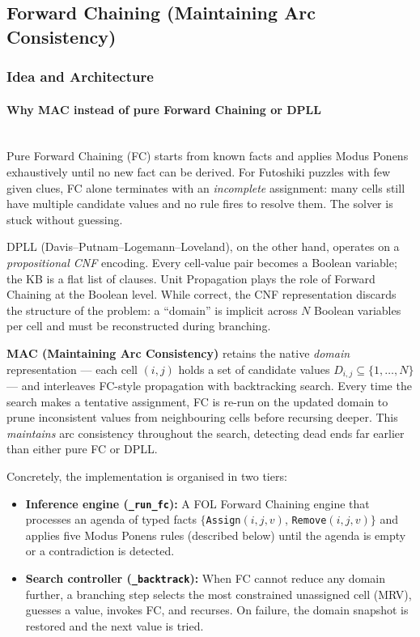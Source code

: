 \subsection{Forward Chaining (Maintaining Arc Consistency)}

\subsubsection{Idea and Architecture}

\paragraph{Why MAC instead of pure Forward Chaining or DPLL}~\\
Pure Forward Chaining (FC) starts from known facts and applies Modus Ponens
exhaustively until no new fact can be derived.  For Futoshiki puzzles with
few given clues, FC alone terminates with an \emph{incomplete} assignment:
many cells still have multiple candidate values and no rule fires to resolve
them.  The solver is stuck without guessing.

DPLL (Davis–Putnam–Logemann–Loveland), on the other hand, operates on a
\emph{propositional CNF} encoding.  Every cell-value pair becomes a Boolean
variable; the KB is a flat list of clauses.  Unit Propagation plays the role
of Forward Chaining at the Boolean level.  While correct, the CNF
representation discards the structure of the problem: a ``domain'' is
implicit across $N$ Boolean variables per cell and must be reconstructed
during branching.

\textbf{MAC (Maintaining Arc Consistency)} retains the native \emph{domain}
representation — each cell $(i,j)$ holds a set of candidate values
$D_{i,j} \subseteq \{1,\ldots,N\}$ — and interleaves FC-style propagation
with backtracking search.  Every time the search makes a tentative
assignment, FC is re-run on the updated domain to prune inconsistent values
from neighbouring cells before recursing deeper.  This \emph{maintains} arc
consistency throughout the search, detecting dead ends far earlier than
either pure FC or DPLL.

Concretely, the implementation is organised in two tiers:

\begin{itemize}
    \item \textbf{Inference engine (\texttt{\_run\_fc}):}  A FOL Forward
    Chaining engine that processes an agenda of typed facts
    $\{$\texttt{Assign}$(i,j,v)$, \texttt{Remove}$(i,j,v)\}$
    and applies five Modus Ponens rules (described below) until the agenda is
    empty or a contradiction is detected.

    \item \textbf{Search controller (\texttt{\_backtrack}):}  When FC cannot
    reduce any domain further, a branching step selects the most constrained
    unassigned cell (MRV), guesses a value, invokes FC, and recurses.
    On failure, the domain snapshot is restored and the next value is tried.
\end{itemize}

